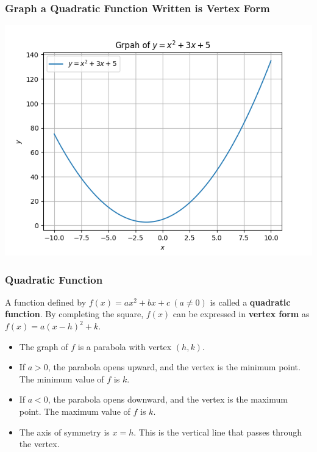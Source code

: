 \documentclass{beamer}
\begin{document}
\begin{frame}
    \frametitle{Graph a Quadratic Function Written is Vertex Form}
    \includegraphics[scale=0.5]{figs/Figure_3.png}
\end{frame}

\begin{frame}
    \frametitle{Quadratic Function}

    A function defined by \(f(x) = ax^2 +bx +c~ (a \ne 0)\) is called a \textbf{quadratic function}. By completing the square, \(f(x)\) can be expressed in \textbf{vertex form} as \(f(x)= a(x-h)^2+k\).\pause
    \begin{itemize}
        \item The graph of \(f\) is a parabola with vertex \((h,k)\). \pause
        \item If \(a>0\), the parabola opens upward, and the vertex is the minimum point. The minimum value of \(f\) is \(k\). \pause
        \item If \(a<0\), the parabola opens downward, and the vertex is the maximum point. The maximum value of \(f\) is \(k\). \pause
        \item The axis of symmetry is \(x=h\). This is the vertical line that passes through the vertex. 
    \end{itemize}

\end{frame}
\end{document}
